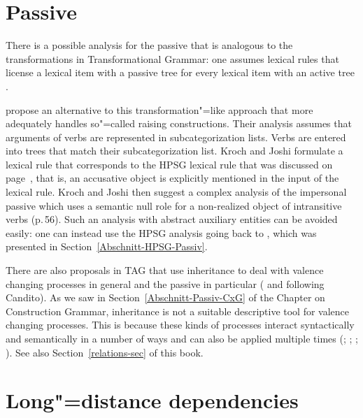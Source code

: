 \section{Passive}

There is a possible analysis for the passive that is analogous to the transformations in Transformational Grammar: one assumes lexical rules that
license a lexical item with a passive tree for every lexical item with an active tree \citep[--51]{KJ85a}. 

\citet[]{KJ85a} propose an alternative to this transformation"=like approach that more adequately handles so"=called raising constructions.
Their analysis assumes that arguments of verbs are represented in subcategorization lists. Verbs are entered into trees that match their subcategorization
list. Kroch and Joshi formulate a lexical rule that corresponds to the HPSG lexical rule that was discussed on page~\pageref{pass-lr-mlr}, that is,
an accusative object is explicitly mentioned in the input of the lexical rule. Kroch and Joshi then suggest a complex analysis of the impersonal passive which
uses a semantic null role for a non-realized object of intransitive verbs (p.\,56). Such an analysis
with abstract auxiliary entities can be avoided easily: one can instead use the HPSG\indexhpsg
analysis going back to \citet{Haider86}, which was presented in Section~\ref{Abschnitt-HPSG-Passiv}.

There are also proposals in TAG that use inheritance to deal with valence changing processes 
in general and the passive in particular (\citealp{Candito96a} and \citealp*{KSYJ2006a} following Candito). As we saw in Section~\ref{Abschnitt-Passiv-CxG} of 
the Chapter on Construction Grammar, inheritance is not a suitable descriptive tool for valence changing processes. This is because these kinds of processes
interact syntactically and semantically in a number of ways and can also be applied multiple times
(\citealp{Mueller2006d,Mueller2007d}; \citeyear[Section~7.5.2]{MuellerLehrbuch1};
\citeyear{MuellerUnifying}; \citeyear{MWArgSt}). See also Section~\ref{relations-sec} of this book.%

\section{Long"=distance dependencies}
\label{TAG-Fernabh}

